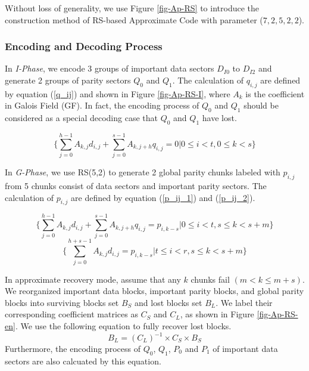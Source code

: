 \documentclass[sigconf]{acmart}
\begin{document}
Without loss of generality, we use Figure \ref{fig-Ap-RS} to introduce the construction method of RS-based Approximate Code with parameter ($7,2,5,2,2$).

\subsubsection{Encoding and Decoding Process}
In \emph{I-Phase}, we encode 3 groups of important data sectors $D_{I0}$ to $D_{I2}$ and generate 2 groups of parity sectors $Q_{0}$ and $Q_{1}$. 
The calculation of $q_{i,j}$ are defined by equation (\ref{q_ij}) and shown in Figure \ref{fig-Ap-RS-I}, where $A_k$ is the coefficient in Galois Field (GF). 
In fact, the encoding process of $Q_{0}$ and $Q_{1}$ should be considered as a special decoding case that $Q_{0}$ and $Q_{1}$ have lost.

\begin{equation}\label{q_ij}
    \{ \sum_{j=0}^{h-1} A_{k,j} d_{i,j} + \sum_{j=0}^{s-1}A_{k,j+h} q_{i,j} = 0 
    | 0 \leqslant i < t, 0 \leqslant k < s \}
\end{equation}

In \emph{G-Phase}, we use RS(5,2) to generate 2 global parity chunks labeled with $p_{i,j}$ from 5 chunks consist of data sectors and important parity sectors. The calculation of $p_{i,j}$ are defined by equation (\ref{p_ij_1}) and (\ref{p_ij_2}).

\begin{equation}\label{p_ij_1}
    \{ \sum_{j=0}^{h-1} A_{k,j} d_{i,j} + \sum_{j=0}^{s-1}A_{k,j+h} q_{i,j} = p_{i,k-s}  
    | 0 \leqslant i < t, s \leqslant k < s+m \}
\end{equation}
\begin{equation}\label{p_ij_2}
    \{ \sum_{j=0}^{h+s-1} A_{k,j} d_{i,j} = p_{i,k-s} 
    | t \leqslant i < r, s \leqslant k < s+m \}
\end{equation}

In approximate recovery mode, assume that any $k$ chunks fail $(m < k \leqslant m+s)$. We reorganized important data blocks, important parity blocks, and global parity blocks into surviving blocks set $B_S$ and lost blocks set $B_L$. We label their corresponding coefficient matrices as $C_S$ and $C_L$, as shown in Figure \ref{fig-Ap-RS-en}. We use the following equation to fully recover lost blocks. 
\begin{equation*}
    B_L = (C_L)^{-1} \times C_S \times B_S
\end{equation*}
Furthermore, the encoding process of $Q_0$, $Q_1$, $P_0$ and $P_1$ of important data sectors are also calcuated by this equation.
\end{document}
